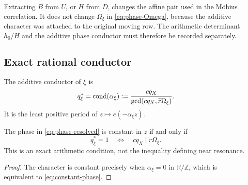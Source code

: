 \begin{remark}
\label{rem:determinant-phase-different}
Extracting \(B\) from \(U\), or \(H\) from \(D\), changes the affine
pair used in the M\"obius correlation.  It does not change
\(\Omega_\xi\) in \eqref{eq:phase-Omega}, because the additive
character was attached to the original moving row.  The arithmetic
determinant \(h_0/H\) and the additive phase conductor must therefore
be recorded separately.
\end{remark}

\subsection{Exact rational conductor}

\begin{definition}
\label{def:resolved-conductor}
The additive conductor of \(\xi\) is
\begin{equation}
 q_\xi^\ast
 =
 \operatorname{cond}(\alpha_\xi)
 :=
 \frac{c q_X}{\gcd(cq_X,\widetilde r\Omega_\xi)}.
\label{eq:resolved-conductor}
\end{equation}
It is the least positive period of \(z\mapsto e(-\alpha_\xi z)\).
\end{definition}

\begin{proposition}
\label{prop:constant-phase}
The phase in \eqref{eq:phase-resolved} is constant in \(z\) if and
only if
\begin{equation}
 q_\xi^\ast=1
 \quad\Longleftrightarrow\quad
 c q_X\mid \widetilde r\Omega_\xi.
\label{eq:constant-phase}
\end{equation}
This is an exact arithmetic condition, not the inequality defining
near resonance.
\end{proposition}

\begin{proof}
The character is constant precisely when
\(\alpha_\xi=0\) in \(\mathbb R/\mathbb Z\), which is equivalent to
\eqref{eq:constant-phase}.
\end{proof}

